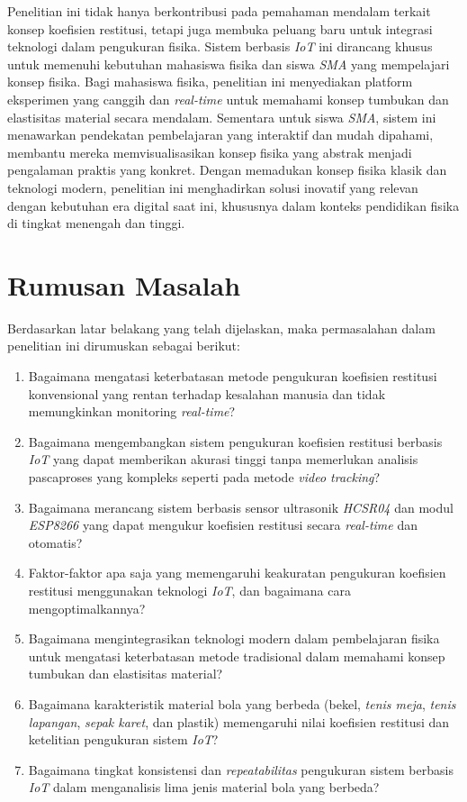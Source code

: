 Penelitian ini tidak hanya berkontribusi pada pemahaman mendalam terkait konsep koefisien restitusi, tetapi juga membuka peluang baru untuk integrasi teknologi dalam pengukuran fisika. Sistem berbasis \textit{IoT} ini dirancang khusus untuk memenuhi kebutuhan mahasiswa fisika dan siswa \textit{SMA} yang mempelajari konsep fisika. Bagi mahasiswa fisika, penelitian ini menyediakan platform eksperimen yang canggih dan \textit{real-time} untuk memahami konsep tumbukan dan elastisitas material secara mendalam. Sementara untuk siswa \textit{SMA}, sistem ini menawarkan pendekatan pembelajaran yang interaktif dan mudah dipahami, membantu mereka memvisualisasikan konsep fisika yang abstrak menjadi pengalaman praktis yang konkret. Dengan memadukan konsep fisika klasik dan teknologi modern, penelitian ini menghadirkan solusi inovatif yang relevan dengan kebutuhan era digital saat ini, khususnya dalam konteks pendidikan fisika di tingkat menengah dan tinggi.

\section{Rumusan Masalah}
 Berdasarkan latar belakang yang telah dijelaskan, maka permasalahan dalam penelitian ini dirumuskan sebagai berikut:
\begin{enumerate}
\item Bagaimana mengatasi keterbatasan metode pengukuran koefisien restitusi konvensional yang rentan terhadap kesalahan manusia dan tidak memungkinkan monitoring \textit{real-time}?
\item Bagaimana mengembangkan sistem pengukuran koefisien restitusi berbasis \textit{IoT} yang dapat memberikan akurasi tinggi tanpa memerlukan analisis pascaproses yang kompleks seperti pada metode \textit{video tracking}?
\item Bagaimana merancang sistem berbasis sensor ultrasonik \textit{HCSR04} dan modul \textit{ESP8266} yang dapat mengukur koefisien restitusi secara \textit{real-time} dan otomatis?
\item Faktor-faktor apa saja yang memengaruhi keakuratan pengukuran koefisien restitusi menggunakan teknologi \textit{IoT}, dan bagaimana cara mengoptimalkannya?
\item Bagaimana mengintegrasikan teknologi modern dalam pembelajaran fisika untuk mengatasi keterbatasan metode tradisional dalam memahami konsep tumbukan dan elastisitas material?
\item Bagaimana karakteristik material bola yang berbeda (bekel, \textit{tenis meja}, \textit{tenis lapangan}, \textit{sepak karet}, dan plastik) memengaruhi nilai koefisien restitusi dan ketelitian pengukuran sistem \textit{IoT}?
\item Bagaimana tingkat konsistensi dan \textit{repeatabilitas} pengukuran sistem berbasis \textit{IoT} dalam menganalisis lima jenis material bola yang berbeda?
\end{enumerate}

